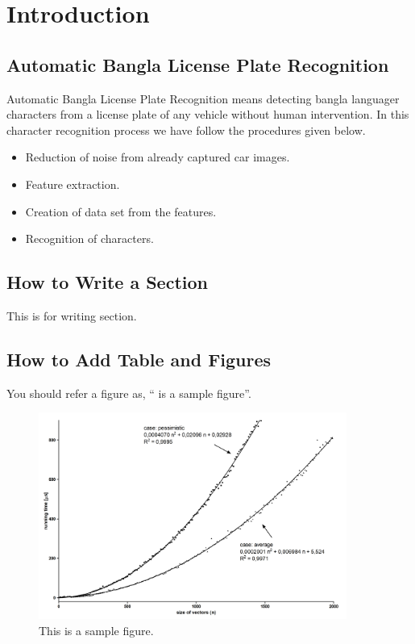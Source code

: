 \chapter{Introduction}\label{intro}


\section{Automatic Bangla License Plate Recognition}
Automatic Bangla License Plate Recognition  means detecting bangla languager characters from a license plate of any vehicle without human intervention. In this character recognition process we have follow the procedures given below.
\begin{itemize}
\item Reduction of noise from already captured car images.
\item Feature extraction.
\item Creation of data set from the features.
\item Recognition of characters.
\end{itemize}
\section{How to Write a Section}

This is for writing section.

\section{How to Add Table and Figures}\label{contribution}
You should refer a figure as, `` is a sample
figure''.

\begin{figure}[!tb]
  \centering
  \includegraphics[width=0.9\textwidth]{figures/sample}
  \caption{This is a sample figure.}
  \label{fig:sample}
\end{figure}

